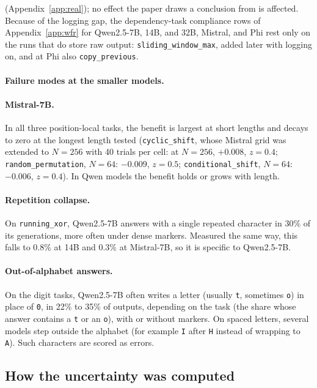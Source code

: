 \documentclass[10pt]{article} %
\newcommand{\task}[1]{\texttt{#1}}
\begin{document}
(Appendix~\ref{app:real}); no effect the paper draws a conclusion from is affected. Because of the logging gap, the dependency-task compliance rows of Appendix~\ref{app:wfr} for Qwen2.5-7B, 14B, and 32B, Mistral, and Phi rest only on the runs that do store raw output: \task{sliding\_window\_max}, added later with logging on, and at Phi also \task{copy\_previous}.

\paragraph{Failure modes at the smaller models.}\label{app:models}
\paragraph{Mistral-7B.} In all three position-local tasks, the benefit is largest at short lengths and decays to zero at the longest length tested (\task{cyclic\_shift}, whose Mistral grid was extended to $N = 256$ with 40 trials per cell: at $N = 256$, $+0.008$, $z = 0.4$; \task{random\_permutation}, $N = 64$: $-0.009$, $z = 0.5$; \task{conditional\_shift}, $N=64$: $-0.006$, $z = 0.4$). In Qwen models the benefit holds or grows with length.

\paragraph{Repetition collapse.} On \task{running\_xor}, Qwen2.5-7B answers with a single repeated character in 30\% of its generations, more often under dense markers. Measured the same way, this falls to 0.8\% at 14B and 0.3\% at Mistral-7B, so it is specific to Qwen2.5-7B.

\paragraph{Out-of-alphabet answers.} On the digit tasks, Qwen2.5-7B often writes a letter (usually \texttt{t}, sometimes \texttt{o}) in place of \texttt{0}, in 22\% to 35\% of outputs, depending on the task (the share whose answer contains a \texttt{t} or an \texttt{o}), with or without markers. On spaced letters, several models step outside the alphabet (for example \texttt{I} after \texttt{H} instead of wrapping to \texttt{A}). Such characters are scored as errors.

\subsection{How the uncertainty was computed}
\label{app:stats}
\end{document}
